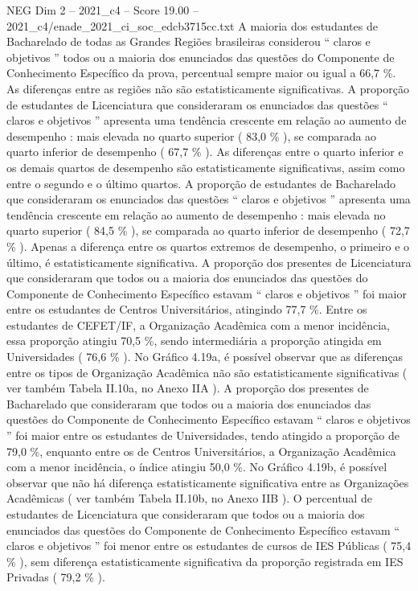 \begin{textsample}{NEG Dim 2 – 2021\_c4 – Score 19.00 – 2021\_c4/enade\_2021\_ci\_soc\_edcb3715cc.txt}
A maioria dos estudantes de Bacharelado de todas as Grandes Regiões brasileiras considerou “ claros e objetivos ” todos ou a maioria dos enunciados das questões do Componente de Conhecimento Específico da prova, percentual sempre maior ou igual a 66,7 \%.
As diferenças entre as regiões não são estatisticamente significativas.
A proporção de estudantes de Licenciatura que consideraram os enunciados das questões “ claros e objetivos ” apresenta uma tendência crescente em relação ao aumento de desempenho : mais elevada no quarto superior ( 83,0 \% ), se comparada ao quarto inferior de desempenho ( 67,7 \% ).
As diferenças entre o quarto inferior e os demais quartos de desempenho são estatisticamente significativas, assim como entre o segundo e o último quartos.
A proporção de estudantes de Bacharelado que consideraram os enunciados das questões “ claros e objetivos ” apresenta uma tendência crescente em relação ao aumento de desempenho : mais elevada no quarto superior ( 84,5 \% ), se comparada ao quarto inferior de desempenho ( 72,7 \% ).
Apenas a diferença entre os quartos extremos de desempenho, o primeiro e o último, é estatisticamente significativa.
A proporção dos presentes de Licenciatura que consideraram que todos ou a maioria dos enunciados das questões do Componente de Conhecimento Específico estavam “ claros e objetivos ” foi maior entre os estudantes de Centros Universitários, atingindo 77,7 \%.
Entre os estudantes de CEFET/IF, a Organização Acadêmica com a menor incidência, essa proporção atingiu 70,5 \%, sendo intermediária a proporção atingida em Universidades ( 76,6 \% ).
No Gráfico 4.19a, é possível observar que as diferenças entre os tipos de Organização Acadêmica não são estatisticamente significativas ( ver também Tabela II.10a, no Anexo IIA ).
A proporção dos presentes de Bacharelado que consideraram que todos ou a maioria dos enunciados das questões do Componente de Conhecimento Específico estavam “ claros e objetivos ” foi maior entre os estudantes de Universidades, tendo atingido a proporção de 79,0 \%, enquanto entre os de Centros Universitários, a Organização Acadêmica com a menor incidência, o índice atingiu 50,0 \%.
No Gráfico 4.19b, é possível observar que não há diferença estatisticamente significativa entre as Organizações Acadêmicas ( ver também Tabela II.10b, no Anexo IIB ).
O percentual de estudantes de Licenciatura que consideraram que todos ou a maioria dos enunciados das questões do Componente de Conhecimento Específico estavam “ claros e objetivos ” foi menor entre os estudantes de cursos de IES Públicas ( 75,4 \% ), sem diferença estatisticamente significativa da proporção registrada em IES Privadas ( 79,2 \% ).

\end{textsample}

